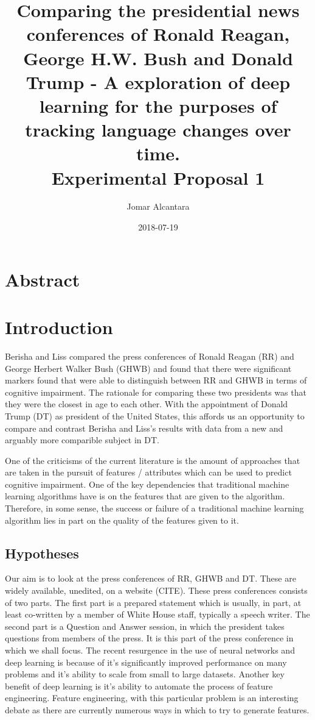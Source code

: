\documentclass{article}
\title{Comparing the presidential news conferences of Ronald Reagan, George H.W. Bush and Donald Trump - A exploration of deep learning for the purposes of tracking language changes over time.\newline \\\large Experimental Proposal 1 }
\date{2018-07-19}
\author{Jomar Alcantara}
\begin{document}
\maketitle
\newpage
\tableofcontents
\newpage
\section{Abstract}
\section{Introduction}

Berisha and Liss compared the press conferences of Ronald Reagan (RR) and George Herbert Walker Bush (GHWB) and found that there were significant markers found that were able to distinguish between RR and GHWB in terms of cognitive impairment. The rationale for comparing these two presidents was that they were the closest in age to each other. With the appointment of Donald Trump (DT) as president of the United States, this affords us an opportunity to compare and contrast Berisha and Liss's results with data from a new and arguably more comparible subject in DT.\newline
\par 
One of the criticisms of the current literature is the amount of approaches that are taken in the pursuit of features / attributes which can be used to predict cognitive impairment. One of the key dependencies that traditional machine learning algorithms have is on the features that are given to the algorithm. Therefore, in some sense, the success or failure of a traditional machine learning algorithm lies in part on the quality of the features given to it. 
\subsection{Hypotheses}
Our aim is to look at the press conferences of RR, GHWB and DT. These are widely available, unedited, on a website (CITE). These press conferences consists of two parts. The first part is a prepared statement which is usually, in part, at least co-written by a member of White House staff, typically a speech writer. The second part is a Question and Answer session, in which the president takes questions from members of the press. It is this part of the press conference in which we shall focus. \newline 
The recent resurgence in the use of neural networks and deep learning is because of it's significantly improved performance on many problems and it's ability to scale from small to large datasets. Another key benefit of deep learning is it's ability to automate the process of feature engineering. Feature engineering, with this particular problem is an interesting debate as there are currently numerous ways in which to try to generate features. \newline
\par 
\end{document}
